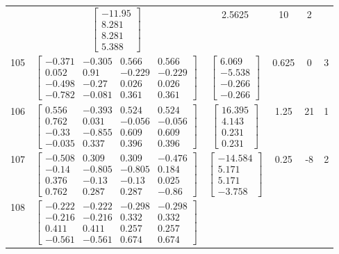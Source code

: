 \documentclass[a4paper,12pt]{article}
\begin{document}
\begin{tabular}{c c c c c c}
&
$\begin{bmatrix} -11.95 \\ 8.281 \\ 8.281 \\ 5.388 \end{bmatrix}$
&
2.5625
&
10
&
2
\\
105
&
$\begin{bmatrix} -0.371 & -0.305 & 0.566 & 0.566 \\ 0.052 & 0.91 & -0.229 & -0.229 \\ -0.498 & -0.27 & 0.026 & 0.026 \\ -0.782 & -0.081 & 0.361 & 0.361 \end{bmatrix}$
&
$\begin{bmatrix} 6.069 \\ -5.538 \\ -0.266 \\ -0.266 \end{bmatrix}$
&
0.625
&
0
&
3
\\
106
&
$\begin{bmatrix} 0.556 & -0.393 & 0.524 & 0.524 \\ 0.762 & 0.031 & -0.056 & -0.056 \\ -0.33 & -0.855 & 0.609 & 0.609 \\ -0.035 & 0.337 & 0.396 & 0.396 \end{bmatrix}$
&
$\begin{bmatrix} 16.395 \\ 4.143 \\ 0.231 \\ 0.231 \end{bmatrix}$
&
1.25
&
21
&
1
\\
107
&
$\begin{bmatrix} -0.508 & 0.309 & 0.309 & -0.476 \\ -0.14 & -0.805 & -0.805 & 0.184 \\ 0.376 & -0.13 & -0.13 & 0.025 \\ 0.762 & 0.287 & 0.287 & -0.86 \end{bmatrix}$
&
$\begin{bmatrix} -14.584 \\ 5.171 \\ 5.171 \\ -3.758 \end{bmatrix}$
&
0.25
&
-8
&
2
\\
108
&
$\begin{bmatrix} -0.222 & -0.222 & -0.298 & -0.298 \\ -0.216 & -0.216 & 0.332 & 0.332 \\ 0.411 & 0.411 & 0.257 & 0.257 \\ -0.561 & -0.561 & 0.674 & 0.674 \end{bmatrix}$

\end{tabular}
\end{document}

